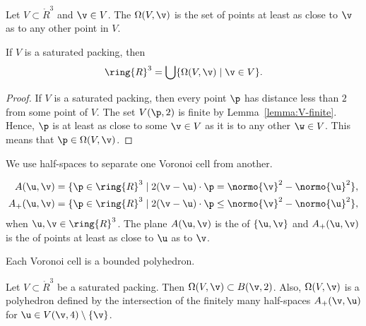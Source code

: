 \begin{definition}\label{def:voronoi} 
Let $V\subset\ring{R}^3$ and $\v\in V$.
The 
$\Omega(V,\v)$
is the set of points at least as close to $\v$ as to
any other point in $V$. 
\end{definition}

\figXOHAZWO %

\begin{lemma}
If $V$ is a saturated packing, then 
\begin{equation}\label{eqn:vor-rn} 
\ring{R}^3 = \bigcup \{\Omega(V,\v)\mid \v \in V\}.
\end{equation}
\end{lemma}

\begin{proof}
  If $V$ is a saturated packing, then every point $\p$ has distance 
  less than $2$ from some point of $V$.  The set $V(\p,2)$ is finite
  by Lemma~\ref{lemma:V-finite}.  Hence, $\p$ is at least as close to
  some $\v\in V$ as it is to any other $\w\in V$.  This means that
  $\p\in\Omega(V,\v)$.  
\end{proof}

We use half-spaces to separate one Voronoi cell from another.

\begin{definition}
\begin{align*} 
A(\u,\v) &= \{\p\in\ring{R}^3
\mid 2(\v-\u)\cdot \p = \normo{\v}^2 - \normo{\u}^2 \},\\
A_+(\u,\v) &= \{\p\in\ring{R}^3
\mid 2(\v-\u)\cdot \p \le \normo{\v}^2 - \normo{\u}^2 \},
\end{align*}
when $\u,\v\in\ring{R}^3$.  The plane $A(\u,\v)$ is the  of
$\{\u,\v\}$ and $A_+(\u,\v)$ is the  of points at least as
close to $\u$ as to $\v$.  
\end{definition}
%
%

Each Voronoi cell is a bounded polyhedron.

\begin{lemma}\label{lemma:V4} 
  Let $V\subset\ring{R}^3$ be a saturated packing.  Then
  $\Omega(V,\v)\subset B(\v,2)$.  Also, $\Omega(V,\v)$ is a polyhedron
  defined by the intersection of the finitely many half-spaces
  $A_+(\v,\u)$ for $\u\in V(\v,4)\setminus\{\v\}$.
\end{lemma}

